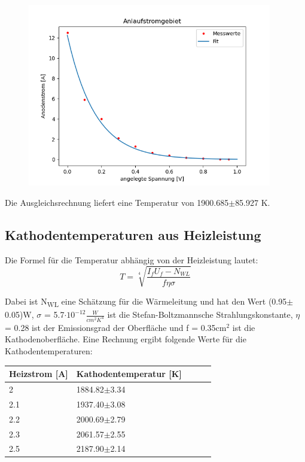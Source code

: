 \begin{figure}[H]
    \centering
    \includegraphics[height=8cm]{"Anlauf.png"}
\end{figure}

\noindent Die Ausgleichsrechnung liefert eine Temperatur von 1900.685$\pm$85.927 K.

\subsection{Kathodentemperaturen aus Heizleistung}

Die Formel für die Temperatur abhängig von der Heizleistung lautet:
\begin{displaymath}
    T = \sqrt[4]{\frac{I_f U_f-N_{WL}}{f \eta \sigma}}
\end{displaymath}

\noindent Dabei ist N\textsubscript{WL} eine Schätzung für die Wärmeleitung und hat den Wert (0.95$\pm$0.05)W, $\sigma$ = 5.7$\cdot 10^{-12} \frac{W}{cm^2K^4}$ ist die Stefan-Boltzmannsche Strahlungskonstante, $\eta$ = 0.28 ist der Emissionsgrad der Oberfläche und f = 0.35cm$^2$ ist die Kathodenoberfläche. Eine Rechnung ergibt folgende Werte für die Kathodentemperaturen:

\begin{minipage}{\linewidth}
    \begin{table}[H]
        \centering
    
    \begin{tabular}{lllll}
        \toprule
        Heizstrom [A] & Kathodentemperatur [K]\\
        \midrule
        2      & 1884.82$\pm$3.34 \\
        2.1    & 1937.40$\pm$3.08 \\
        2.2    & 2000.69$\pm$2.79 \\
        2.3    & 2061.57$\pm$2.55 \\
        2.5    & 2187.90$\pm$2.14 \\
        \bottomrule   
    \end{tabular}
    \label{tab:2}
\end{table}
\end{minipage}

